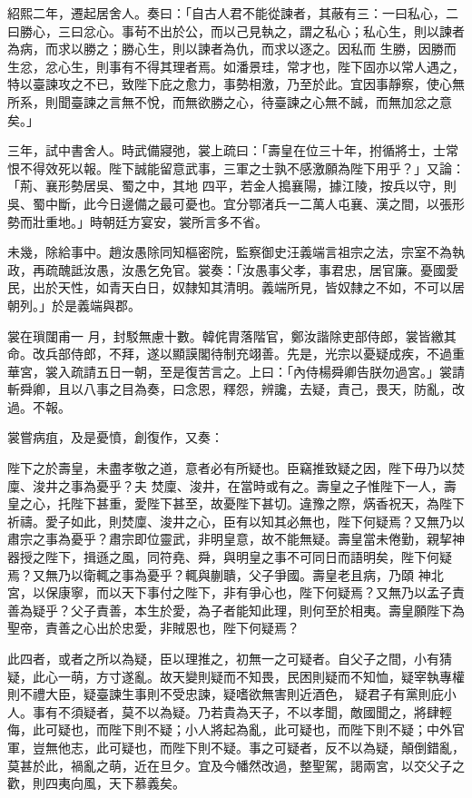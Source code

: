 \begin{pinyinscope}
 紹熙二年，遷起居舍人。奏曰：「自古人君不能從諫者，其蔽有三：一曰私心，二曰勝心，三曰忿心。事茍不出於公，而以己見執之，謂之私心；私心生，則以諫者為病，而求以勝之；勝心生，則以諫者為仇，而求以逐之。因私而
 生勝，因勝而生忿，忿心生，則事有不得其理者焉。如潘景珪，常才也，陛下固亦以常人遇之，特以臺諫攻之不已，致陛下庇之愈力，事勢相激，乃至於此。宜因事靜察，使心無所系，則聞臺諫之言無不悅，而無欲勝之心，待臺諫之心無不誠，而無加忿之意矣。」



 三年，試中書舍人。時武備寢弛，裳上疏曰：「壽皇在位三十年，拊循將士，士常恨不得效死以報。陛下誠能留意武事，三軍之士孰不感激願為陛下用乎？」又論：「荊、襄形勢居吳、蜀之中，其地
 四平，若金人搗襄陽，據江陵，按兵以守，則吳、蜀中斷，此今日邊備之最可憂也。宜分鄂渚兵一二萬人屯襄、漢之間，以張形勢而壯重地。」時朝廷方宴安，裳所言多不省。



 未幾，除給事中。趙汝愚除同知樞密院，監察御史汪義端言祖宗之法，宗室不為執政，再疏醜詆汝愚，汝愚乞免官。裳奏：「汝愚事父孝，事君忠，居官廉。憂國愛民，出於天性，如青天白日，奴隸知其清明。義端所見，皆奴隸之不如，不可以居朝列。」於是義端與郡。



 裳在瑣闥甫一
 月，封駁無慮十數。韓侂胄落階官，鄭汝諧除吏部侍郎，裳皆繳其命。改兵部侍郎，不拜，遂以顯謨閣待制充翊善。先是，光宗以憂疑成疾，不過重華宮，裳入疏請五日一朝，至是復苦言之。上曰：「內侍楊舜卿告朕勿過宮。」裳請斬舜卿，且以八事之目為奏，曰念恩，釋怨，辨讒，去疑，責己，畏天，防亂，改過。不報。



 裳嘗病疽，及是憂憤，創復作，又奏：



 陛下之於壽皇，未盡孝敬之道，意者必有所疑也。臣竊推致疑之因，陛下毋乃以焚廩、浚井之事為憂乎？夫
 焚廩、浚井，在當時或有之。壽皇之子惟陛下一人，壽皇之心，托陛下甚重，愛陛下甚至，故憂陛下甚切。違豫之際，焫香祝天，為陛下祈禱。愛子如此，則焚廩、浚井之心，臣有以知其必無也，陛下何疑焉？又無乃以肅宗之事為憂乎？肅宗即位靈武，非明皇意，故不能無疑。壽皇當未倦勤，親挈神器授之陛下，揖遜之風，同符堯、舜，與明皇之事不可同日而語明矣，陛下何疑焉？又無乃以衛輒之事為憂乎？輒與蒯聵，父子爭國。壽皇老且病，乃頤
 神北宮，以保康寧，而以天下事付之陛下，非有爭心也，陛下何疑焉？又無乃以孟子責善為疑乎？父子責善，本生於愛，為子者能知此理，則何至於相夷。壽皇願陛下為聖帝，責善之心出於忠愛，非賊恩也，陛下何疑焉？



 此四者，或者之所以為疑，臣以理推之，初無一之可疑者。自父子之間，小有猜疑，此心一萌，方寸遂亂。故天變則疑而不知畏，民困則疑而不知恤，疑宰執專權則不禮大臣，疑臺諫生事則不受忠諫，疑嗜欲無害則近酒色，
 疑君子有黨則庇小人。事有不須疑者，莫不以為疑。乃若貴為天子，不以孝聞，敵國聞之，將肆輕侮，此可疑也，而陛下則不疑；小人將起為亂，此可疑也，而陛下則不疑；中外官軍，豈無他志，此可疑也，而陛下則不疑。事之可疑者，反不以為疑，顛倒錯亂，莫甚於此，禍亂之萌，近在旦夕。宜及今幡然改過，整聖駕，謁兩宮，以交父子之歡，則四夷向風，天下慕義矣。




\end{pinyinscope}
